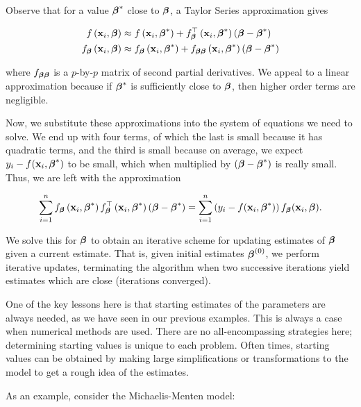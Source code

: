 \documentclass[
]{book}
\theoremstyle{plain}
\theoremstyle{mydefn}
\theoremstyle{myexmpl}
\theoremstyle{remark}
\begin{document}
Observe that for a value \(\boldsymbol{\beta}^*\) close to \(\boldsymbol{\beta}\), a Taylor Series approximation gives

\[
\begin{aligned}
  f\left(\mathbf{x}_i,\boldsymbol{\beta}\right)
    &\approx f\left(\mathbf{x}_i,\boldsymbol{\beta}^*\right) + f^\top_{\boldsymbol{\beta}}\left(\mathbf{x}_i,\boldsymbol{\beta}^*\right)\left(\boldsymbol{\beta} - \boldsymbol{\beta}^*\right) \\
  f_{\boldsymbol{\beta}}\left(\mathbf{x}_i,\boldsymbol{\beta}\right)
    &\approx f_{\boldsymbol{\beta}}\left(\mathbf{x}_i,\boldsymbol{\beta}^*\right) + f_{\boldsymbol{\beta}\boldsymbol{\beta}}\left(\mathbf{x}_i,\boldsymbol{\beta}^*\right)\left(\boldsymbol{\beta} - \boldsymbol{\beta}^*\right)
\end{aligned}
\]

where \(f_{\boldsymbol{\beta}\boldsymbol{\beta}}\) is a \(p\)-by-\(p\) matrix of second partial derivatives. We appeal to a linear approximation because if \(\boldsymbol{\beta}^*\) is sufficiently close to \(\boldsymbol{\beta}\), then higher order terms are negligible.

Now, we substitute these approximations into the system of equations we need to solve. We end up with four terms, of which the last is small because it has quadratic terms, and the third is small because on average, we expect \(y_i - f(\mathbf{x}_i,\boldsymbol{\beta}^*)\) to be small, which when multiplied by \((\boldsymbol{\beta} - \boldsymbol{\beta}^*)\) is really small. Thus, we are left with the approximation

\[
  \sum\limits_{i=1}^{n} f_{\boldsymbol{\beta}}\left(\mathbf{x}_i,\boldsymbol{\beta}^*\right)f_{\boldsymbol{\beta}}^\top\left(\mathbf{x}_i,\boldsymbol{\beta}^*\right)\left(\boldsymbol{\beta}-\boldsymbol{\beta}^*\right) = \sum\limits_{i=1}^{n} \left(y_i - f(\mathbf{x}_i,\boldsymbol{\beta}^*)\right)f_{\boldsymbol{\beta}}(\mathbf{x}_i,\boldsymbol{\beta}).
\]

We solve this for \(\boldsymbol{\beta}\) to obtain an iterative scheme for updating estimates of \(\boldsymbol{\beta}\) given a current estimate. That is, given initial estimates \(\boldsymbol{\beta}^{(0)}\), we perform iterative updates, terminating the algorithm when two successive iterations yield estimates which are close (iterations converged).

One of the key lessons here is that starting estimates of the parameters are always needed, as we have seen in our previous examples. This is always a case when numerical methods are used. There are no all-encompassing strategies here; determining starting values is unique to each problem. Often times, starting values can be obtained by making large simplifications or transformations to the model to get a rough idea of the estimates.

As an example, consider the Michaelis-Menten model:
\end{document}
